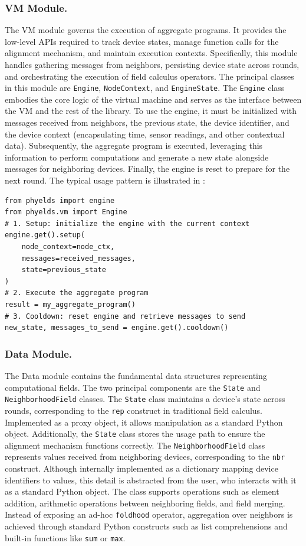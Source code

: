 \documentclass[runningheads]{llncs}
\begin{document}
\subsubsection{VM Module.}
The VM module governs the execution of aggregate programs.
It provides the low-level APIs required to track device states,
manage function calls for the alignment mechanism,
and maintain execution contexts.
Specifically, 
this module handles gathering messages from neighbors,
persisting device state across rounds,
and orchestrating the execution of field calculus operators.
%
The principal classes in this module are \texttt{Engine}, \texttt{NodeContext}, and \texttt{EngineState}.
The \texttt{Engine} class embodies the core logic of the virtual machine
and serves as the interface between the VM and the rest of the library.
To use the engine, it must be initialized with
messages received from neighbors,
the previous state,
the device identifier,
and the device context (encapsulating time, sensor readings, and other contextual data).
Subsequently, the aggregate program is executed,
leveraging this information to perform computations
and generate a new state alongside messages for neighboring devices.
Finally, the engine is reset to prepare for the next round.
%
The typical usage pattern is illustrated in :
\begin{lstlisting}[style=pythonstyle, caption={Engine usage pattern.}, label={lst:engine-usage}]
from phyelds import engine
from phyelds.vm import Engine
# 1. Setup: initialize the engine with the current context
engine.get().setup(
    node_context=node_ctx,
    messages=received_messages,
    state=previous_state
)
# 2. Execute the aggregate program
result = my_aggregate_program()
# 3. Cooldown: reset engine and retrieve messages to send
new_state, messages_to_send = engine.get().cooldown()
\end{lstlisting}

\subsubsection{Data Module.}
The Data module contains the fundamental data structures representing computational fields.
The two principal components are the \texttt{State} and \texttt{NeighborhoodField} classes.
%
The \texttt{State} class maintains a device's state across rounds,
corresponding to the \texttt{rep} construct in traditional field calculus.
Implemented as a proxy object, it allows manipulation as a standard Python object.
Additionally, the \texttt{State} class stores the usage path to ensure the alignment mechanism functions correctly.
%
The \texttt{NeighborhoodField} class represents values received from neighboring devices,
corresponding to the \texttt{nbr} construct.
Although internally implemented as a dictionary mapping device identifiers to values,
this detail is abstracted from the user,
who interacts with it as a standard Python object.
The class supports operations such as element addition,
arithmetic operations between neighboring fields,
and field merging.
Instead of exposing an ad-hoc \texttt{foldhood} operator,
aggregation over neighbors is achieved through standard Python constructs such as list comprehensions and built-in functions like \texttt{sum} or \texttt{max}.
\end{document}
